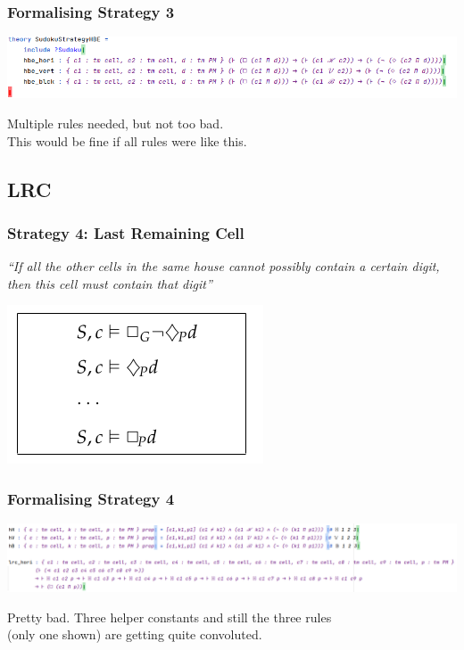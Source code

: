 \documentclass[aspectratio=169, usenames, dvipsnames]{beamer}
\begin{document}
\begin{frame}
\frametitle{Formalising Strategy 3}
\begin{center}
\includegraphics[width=\textwidth, keepaspectratio]{images/strategy_form_hbe.png}
\pause\bigskip

Multiple rules needed, but not too bad.\\
This would be fine if all rules were like this.
\end{center}
\end{frame}

\subsection{LRC}

\begin{frame}
\frametitle{Strategy 4: Last Remaining Cell}
\begin{center}
\emph{``If all the other cells in the same house cannot possibly contain a certain digit,\\ then this cell must contain that digit''}
\bigskip

\includegraphics[height=0.4\textheight,keepaspectratio]{images/strategy_nd_lrc.png} 
\end{center}

\end{frame}

\begin{frame}
\frametitle{Formalising Strategy 4}
\begin{center}
\includegraphics[width=\textwidth, keepaspectratio]{images/strategy_form_lrc.png}
\pause\bigskip

Pretty bad. Three helper constants and still the three rules\\ (only one shown) are getting quite convoluted.
\end{center}
\end{frame}
\end{document}
